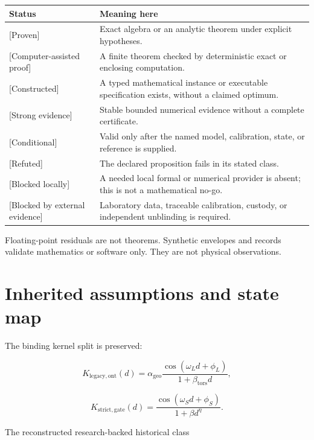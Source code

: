 \documentclass[11pt,a4paper,openany]{report}
\newcommand{\statusProven}{\textcolor{fingreen}{[Proven]}}
\newcommand{\statusStrong}{\textcolor{finblue}{[Strong evidence]}}
\newcommand{\statusRefuted}{\textcolor{finred}{[Refuted]}}
\begin{document}
\begin{center}
\begingroup\small
\setlength{\tabcolsep}{2.5pt}
\renewcommand{\arraystretch}{1.16}
\begin{longtable}{@{}p{}p{}@{}}
\toprule
\textbf{Status} & \textbf{Meaning here} \\
\midrule
\endhead
\statusProven{} & Exact algebra or an analytic theorem under explicit hypotheses. \\
\textcolor{fingreen}{[Computer-assisted proof]} & A finite theorem checked by deterministic exact or enclosing computation. \\
\textcolor{finblue}{[Constructed]} & A typed mathematical instance or executable specification exists, without a claimed optimum. \\
\statusStrong{} & Stable bounded numerical evidence without a complete certificate. \\
\textcolor{finviolet}{[Conditional]} & Valid only after the named model, calibration, state, or reference is supplied. \\
\statusRefuted{} & The declared proposition fails in its stated class. \\
\textcolor{finorange}{[Blocked locally]} & A needed local formal or numerical provider is absent; this is not a mathematical no-go. \\
\textcolor{finred}{[Blocked by external evidence]} & Laboratory data, traceable calibration, custody, or independent unblinding is required. \\
\bottomrule
\end{longtable}
\endgroup
\end{center}

Floating-point residuals are not theorems. Synthetic envelopes and records validate mathematics or software only. They are not physical observations.

\chapter{Inherited assumptions and state map}

The binding kernel split is preserved:

\[
K_{\mathrm{legacy,ont}}(d)
=\alpha_{\mathrm{geo}}
\frac{\cos(\omega_Ld+\phi_L)}{1+\beta_{\mathrm{tors}}d},
\]

\[
K_{\mathrm{strict,gate}}(d)
=\frac{\cos(\omega_Sd+\phi_S)}{1+\beta d^\eta}.
\]

The reconstructed research-backed historical class
\end{document}
